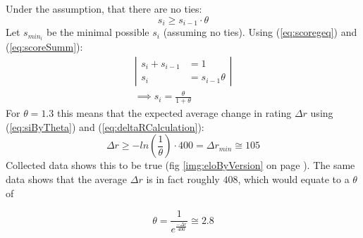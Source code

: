 \documentclass[12pt]{article}
\newcommand{\imgRef}[1]{(fig \ref{#1} on page \pageref{#1})}
\newcommand{\quckeq}[1]{(\ref{#1})}
\newcommand{\quickeq}[1]{\quckeq{#1}}
\newcommand{\FittedEloRaiting}{408}
\newcommand{\FittedScoringThreshold}{2.8}
\begin{document}
Under the assumption, that there are no ties:
\begin{equation}\label{eq:scoregeq}
s_i \geqslant s_{i-1} \cdot \theta
\end{equation}
Let \(s_{min_i}\) be the minimal possible \(s_i\) (assuming no ties). Using \quickeq{eq:scoregeq} and \quickeq{eq:scoreSumm}:
\begin{align}
\left|\begin{aligned}
s_i + s_{i-1} &= 1\\
s_i                 &= s_{i-1}\theta
\end{aligned}\right|\\
\implies s_i = \frac{\theta}{1+\theta}\label{eq:siByTheta}
\end{align}
For \(\theta = 1.3\) this means that the expected average change in rating \(\Delta r\) using \quickeq{eq:siByTheta} and \quickeq{eq:deltaRCalculation}:
\begin{equation}
\Delta r \geqslant -ln\left(\frac{1}{\theta}\right)\cdot 400 = \Delta r_{min} \cong 105
\end{equation}
Collected data shows this to be true \imgRef{img:eloByVersion}. The same data shows that the average \(\Delta r \) is in fact roughly \(\FittedEloRaiting\), which would equate to a \(\theta\) of

\begin{equation}
\theta = \frac{1}{e^{\frac{-\Delta r}{400}}} \cong \FittedScoringThreshold
\end{equation}
\begin{center}
	
	\captionsetup{width=.8\linewidth}
	\label{img:eloByVersion}
\end{center}
\end{document}
